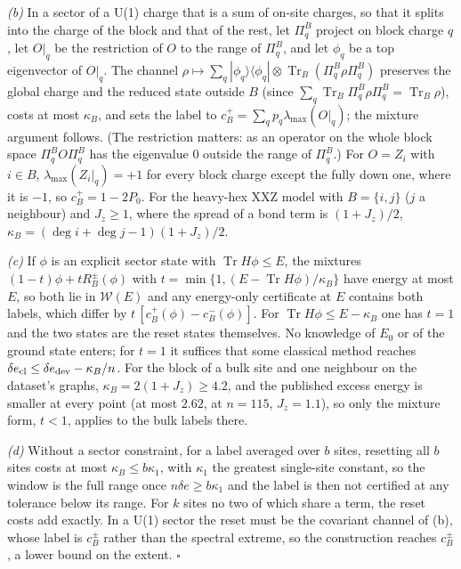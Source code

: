 \documentclass[aps,prx,onecolumn,10pt,nofootinbib,longbibliography,floatfix]{revtex4-2}
\theoremstyle{remark}
\newcommand{\Jz}{J_z}
\newcommand{\de}{\delta e}
\newcommand{\W}{\mathcal{W}}
\newcommand{\Tr}{\operatorname{Tr}}
\begin{document}
\emph{(b)} In a sector of a U(1) charge that is a sum of on-site charges, so that it splits into the charge of the
block and that of the rest, let $\Pi^B_q$ project on block charge $q$, let $O|_q$ be the restriction of $O$ to the
range of $\Pi^B_q$, and let $\phi_q$ be a top eigenvector of $O|_q$. %
The channel $\rho\mapsto\sum_q|\phi_q\rangle\langle\phi_q|\otimes\Tr_B(\Pi^B_q\rho\Pi^B_q)$
preserves the global charge and the reduced state outside $B$ (since $\sum_q\Tr_B\Pi^B_q\rho\Pi^B_q=\Tr_B\rho$), costs
at most $\kappa_B$, and sets the label to $c_B^+=\sum_qp_q\lambda_{\max}(O|_q)$; the mixture argument
follows. (The restriction matters: as an operator on the whole block space $\Pi_q^BO\Pi_q^B$ has the eigenvalue $0$ %
outside the range of $\Pi^B_q$.) For $O=Z_i$ with $i\in B$, $\lambda_{\max}(Z_i|_q)=+1$ for every block charge except the fully %
down one, where it is $-1$, so $c_B^+=1-2P_0$. For the heavy-hex XXZ model with $B=\{i,j\}$ ($j$ a neighbour) and %
$\Jz\ge1$, where the spread of a bond term is $(1+\Jz)/2$, $\kappa_B=(\deg i+\deg j-1)(1+\Jz)/2$. %

\emph{(c)} If $\phi$ is an explicit sector state with $\Tr H\phi\le E$, the mixtures
$(1-t)\phi+tR^\pm_B(\phi)$ with $t=\min\{1,(E-\Tr H\phi)/\kappa_B\}$ have energy at most $E$, so both lie in $\W(E)$
and any energy-only certificate at $E$ contains both labels, which differ by $t\,[c_B^+(\phi)-c_B^-(\phi)]$. %
For $\Tr H\phi\le E-\kappa_B$ one has $t=1$ and the two states are the reset states themselves.
No knowledge of $E_0$ or of the ground state enters; for $t=1$ it suffices that some classical method reaches %
$\de_{\rm cl}\le\de_{\rm dev}-\kappa_B/n$. For the block of a bulk site and one neighbour on the dataset's graphs,
$\kappa_B=2(1+\Jz)\ge4.2$, and the published excess energy is smaller at every point (at most $2.62$, at $n=115$, %
$\Jz=1.1$), so only the mixture form, $t<1$, applies to the bulk labels there.

\emph{(d)} Without a sector constraint, for a label averaged over $b$ sites, resetting all $b$ sites costs at most
$\kappa_B\le b\kappa_1$, with %
$\kappa_1$ the greatest single-site constant, so the window is the full range once $n\de\ge b\kappa_1$ and the label %
is then not certified at any tolerance below its range. For $k$ sites no two of which share a term, the reset costs add
exactly. In a U(1) sector the reset must be the covariant channel of (b), whose label is $c_B^\pm$ rather than
the spectral extreme, so the construction reaches $c_B^\pm$, a lower bound on the extent. \hfill$\square$
\end{document}
